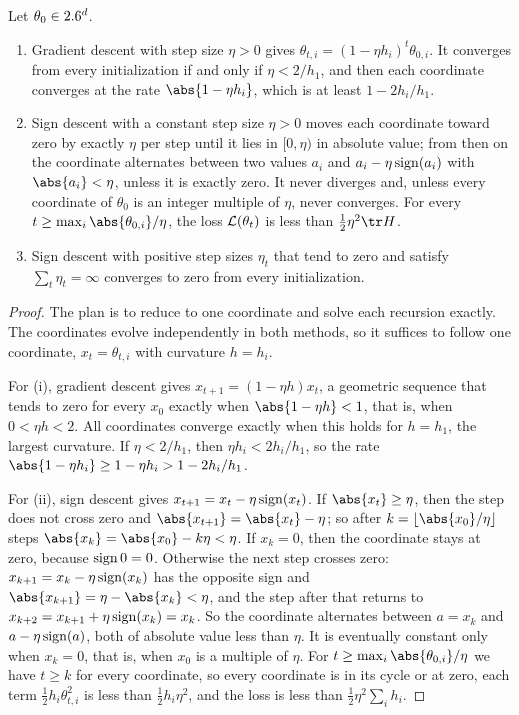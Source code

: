\begin{refsection}
\begin{theorem*}
Let $\theta_0\in2.6^d$.
\begin{enumerate}
\item Gradient descent with step size $\eta>0$ gives $\theta_{t,i}=(1-\eta h_i)^t\theta_{0,i}$. It converges from every initialization if and only if $\eta<2/h_1$, and then each coordinate converges at the rate $\abs{1-\eta h_i}$, which is at least $1-2h_i/h_1$.
\item Sign descent with a constant step size $\eta>0$ moves each coordinate toward zero by exactly $\eta$ per step until it lies in $[0,\eta)$ in absolute value; from then on the coordinate alternates between two values $a_i$ and $a_i-\eta\operatorname{sign}(a_i)$ with $\abs{a_i}<\eta$, unless it is exactly zero. It never diverges and, unless every coordinate of $\theta_0$ is an integer multiple of $\eta$, never converges. For every $t\ge\max_i\abs{\theta_{0,i}}/\eta$, the loss $\mathcal{L}(\theta_t)$ is less than $\frac12\eta^2\tr H$.
\item Sign descent with positive step sizes $\eta_t$ that tend to zero and satisfy $\sum_t\eta_t=\infty$ converges to zero from every initialization.
\end{enumerate}
\end{theorem*}

\begin{proof}
The plan is to reduce to one coordinate and solve each recursion exactly. The coordinates evolve independently in both methods, so it suffices to follow one coordinate, $x_t=\theta_{t,i}$ with curvature $h=h_i$.

For (i), gradient descent gives $x_{t+1}=(1-\eta h)x_t$, a geometric sequence that tends to zero for every $x_0$ exactly when $\abs{1-\eta h}<1$, that is, when $0<\eta h<2$. All coordinates converge exactly when this holds for $h=h_1$, the largest curvature. If $\eta<2/h_1$, then $\eta h_i<2h_i/h_1$, so the rate $\abs{1-\eta h_i}\ge1-\eta h_i>1-2h_i/h_1$.

For (ii), sign descent gives $x_{t+1}=x_t-\eta\operatorname{sign}(x_t)$. If $\abs{x_t}\ge\eta$, then the step does not cross zero and $\abs{x_{t+1}}=\abs{x_t}-\eta$; so after $k=\lfloor\abs{x_0}/\eta\rfloor$ steps $\abs{x_k}=\abs{x_0}-k\eta<\eta$. If $x_k=0$, then the coordinate stays at zero, because $\operatorname{sign}0=0$. Otherwise the next step crosses zero: $x_{k+1}=x_k-\eta\operatorname{sign}(x_k)$ has the opposite sign and $\abs{x_{k+1}}=\eta-\abs{x_k}<\eta$, and the step after that returns to $x_{k+2}=x_{k+1}+\eta\operatorname{sign}(x_k)=x_k$. So the coordinate alternates between $a=x_k$ and $a-\eta\operatorname{sign}(a)$, both of absolute value less than $\eta$. It is eventually constant only when $x_k=0$, that is, when $x_0$ is a multiple of $\eta$. For $t\ge\max_i\abs{\theta_{0,i}}/\eta$ we have $t\ge k$ for every coordinate, so every coordinate is in its cycle or at zero, each term $\frac12h_i\theta_{t,i}^2$ is less than $\frac12h_i\eta^2$, and the loss is less than $\frac12\eta^2\sum_ih_i$.


\end{proof}
\end{refsection}

